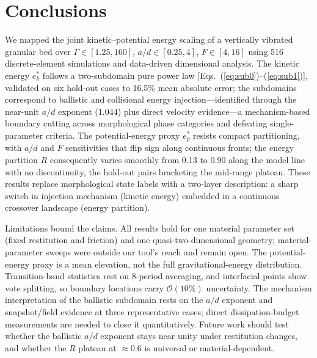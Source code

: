 \documentclass[aps,pre,twocolumn,superscriptaddress,floatfix]{revtex4-2}
\begin{document}
\section{Conclusions}
\label{sec:conclusions}
We mapped the joint kinetic--potential energy scaling of a vertically vibrated granular bed over $\Gamma\in[1.25,160]$, $a/d\in[0.25,4]$, $F\in[4,16]$ using 516 discrete-element simulations and data-driven dimensional analysis. The kinetic energy $e_k^*$ follows a two-subdomain pure power law [Eqs.~(\ref{eq:sub0})--(\ref{eq:sub1})], validated on six hold-out cases to 16.5\% mean absolute error; the subdomains correspond to ballistic and collisional energy injection---identified through the near-unit $a/d$ exponent (1.044) plus direct velocity evidence---a mechanism-based boundary cutting across morphological phase categories and defeating single-parameter criteria. The potential-energy proxy $e_p^*$ resists compact partitioning, with $a/d$ and $F$ sensitivities that flip sign along continuous fronts; the energy partition $R$ consequently varies smoothly from 0.13 to 0.90 along the model line with no discontinuity, the hold-out pairs bracketing the mid-range plateau. These results replace morphological state labels with a two-layer description: a sharp switch in injection mechanism (kinetic energy) embedded in a continuous crossover landscape (energy partition).

Limitations bound the claims. All results hold for one material parameter set (fixed restitution and friction) and one quasi-two-dimensional geometry; material-parameter sweeps were outside our tool's reach and remain open. The potential-energy proxy is a mean elevation, not the full gravitational-energy distribution. Transition-band statistics rest on 8-period averaging, and interfacial points show vote splitting, so boundary locations carry $\mathcal O(10\%)$ uncertainty. The mechanism interpretation of the ballistic subdomain rests on the $a/d$ exponent and snapshot/field evidence at three representative cases; direct dissipation-budget measurements are needed to close it quantitatively. Future work should test whether the ballistic $a/d$ exponent stays near unity under restitution changes, and whether the $R$ plateau at $\approx0.6$ is universal or material-dependent.
\end{document}
